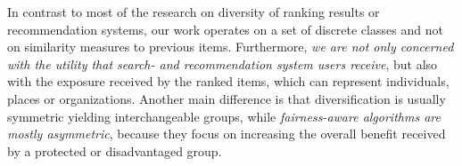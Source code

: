 In contrast to most of the research on diversity of ranking results or recommendation systems, our work operates on a set of discrete classes and not on similarity measures to previous items.
%
Furthermore, \emph{we are not only concerned with the utility that search- and recommendation system users receive}, but also with the exposure received by the ranked items, which can represent individuals, places or organizations.
%
Another main difference is that diversification is usually symmetric yielding interchangeable groups, while \emph{fairness-aware algorithms are mostly asymmetric}, because they focus on increasing the overall benefit received by a protected or disadvantaged group.
